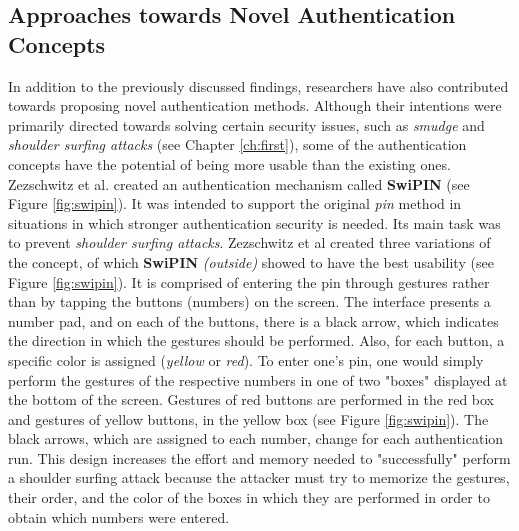 \subsection{Approaches towards Novel Authentication Concepts} \label{2.2.3}

In addition to the previously discussed findings, researchers have also contributed towards proposing novel authentication methods. Although their intentions were primarily directed towards solving certain security issues, such as \textit{smudge} and \textit{shoulder surfing attacks} (see Chapter \ref{ch:first}), some of the authentication concepts have the potential of being more usable than the existing ones.\\

Zezschwitz et al. \cite{Swipin} created an authentication mechanism called \textbf{SwiPIN} (see Figure \ref{fig:swipin}). It was intended to support the original \textit{pin} method in situations in which stronger authentication security is needed. Its main task was to prevent \textit{shoulder surfing attacks}. Zezschwitz et al \cite{Swipin} created three variations of the concept, of which \textbf{SwiPIN} \textit{(outside)} showed to have the best usability (see Figure \ref{fig:swipin}). It is comprised of entering the pin through gestures rather than by tapping the buttons (numbers) on the screen. The interface presents a number pad, and on each of the buttons, there is a black arrow, which indicates the direction in which the gestures should be performed. Also, for each button, a specific color is assigned (\textit{yellow} or \textit{red}). To enter one's pin, one would simply perform the gestures of the respective numbers in one of two "boxes" displayed at the bottom of the screen. Gestures of red buttons are performed in the red box and gestures of yellow buttons, in the yellow box (see Figure \ref{fig:swipin}). The black arrows, which are assigned to each number, change for each authentication run. This design increases the effort and memory needed to "successfully" perform a shoulder surfing attack because the attacker must try to memorize the gestures, their order, and the color of the boxes in which they are performed in order to obtain which numbers were entered. \\

